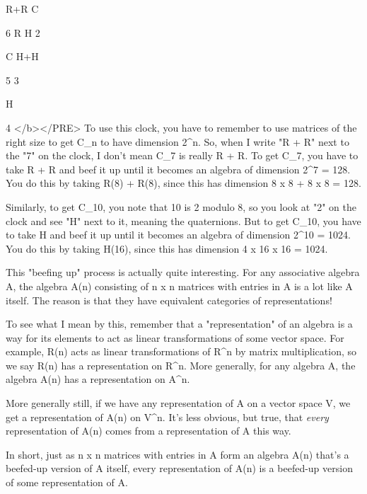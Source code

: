                    R+R                             C





             6   R                                       H   2
 




                    C                             H+H
                 
                  5                                    3

                                    H

                                    4
</b></PRE>
To use this clock, you have to remember to use matrices of the right size to 
get C_{n} to have dimension 2^{n}.  
So, when I write "R + R" next to the "7" on 
the clock, I don't mean C_{7} is really R + R.  To get 
C_{7}, you have to take 
R + R and beef it up until it becomes an algebra of dimension 2^{7} 
= 128.  You 
do this by taking R(8) + R(8), since this has dimension 8 x 8 + 8 x 8 = 128.  

Similarly, to get C_{10}, you note that 10 is 2 modulo 8, so you look at
"2" on the clock and see "H" next to it, meaning the quaternions.  But to get 
C_{10}, 
you have to take H and beef it up until it becomes an algebra of 
dimension 2^{10} = 1024.  You do this by taking H(16), since this 
has dimension 4 x 16 x 16 = 1024.   

This "beefing up" process is actually quite interesting.  For any associative
algebra A, the algebra A(n) consisting of n x n matrices with entries in A 
is a lot like A itself.  The reason is that they have equivalent categories 
of representations!   

To see what I mean by this, remember that a "representation" of an algebra
is a way for its elements to act as linear transformations of some vector
space.  For example, R(n) acts as linear transformations of R^{n} 
by matrix 
multiplication, so we say R(n) has a representation on R^{n}.  
More generally,
for any algebra A, the algebra A(n) has a representation on A^{n}.  

More generally still, if we have any representation of A on a vector space V, 
we get a representation of A(n) on V^{n}.  It's less obvious,
but true, that \emph{every} 
representation of A(n) comes from a representation of
A this way.  

In short, just as n x n matrices with entries in A form an algebra A(n) 
that's a 
beefed-up version of A itself, every representation of A(n) is a beefed-up
version of some representation of A.  

